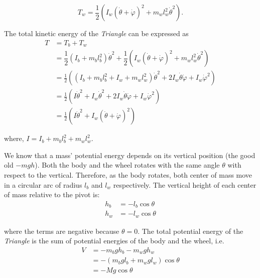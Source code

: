 \documentclass{article}
\begin{document}
\begin{equation}
  T_w=\dfrac{1}{2}\left(I_{w}(\dot{\theta}+\dot{\varphi})^{2}+m_{w}l_{w}^{2}\dot{\theta}^2\right).
\end{equation}

The total kinetic energy of the \textit{Triangle} can be expressed as
\begin{equation}
  \begin{split}
    T&=T_{b}+T_{w}\\
    &=\dfrac{1}{2}\left(I_{b} + m_{b} l_{b}^{2}\right)\dot{\theta}^{2}+\dfrac{1}{2}\left(I_{w}(\dot{\theta}+\dot{\varphi})^{2}+m_{w}l_{w}^{2}\dot{\theta}^2\right)\\
    &= \frac{1}{2}\left(\left(I_b+m_{b}l_{b}^{2}+I_{w}+m_{w}l_{w}^{2}\right)\dot{\theta}^2+2I_{w}\dot{\theta}\dot{\varphi}+I_{w}\dot{\varphi}^2\right)\\
    &= \frac{1}{2}\left(I\dot{\theta}^2+I_{w}\dot{\theta}^{2}+2I_{w}\dot{\theta}\dot{\varphi}+I_{w}\dot{\varphi}^2\right)\\
    &= \frac{1}{2}\left(I\dot{\theta}^{2}+I_{w}(\dot{\theta}+\dot{\varphi})^{2}\right)
  \end{split}
\end{equation}

where, $I=I_b+m_{b}l_{b}^{2}+m_{w}l_{w}^{2}$.

We know that a mass' potential energy depends on its vertical position (the good old $-mgh$). Both the body and the wheel rotates with the same angle $\theta$ with respect to the vertical. Therefore, as the body rotates, both center of mass move in a circular arc of radius $l_{b}$ and $l_{w}$ respectively. The vertical height of each center of mass relative to the pivot is:
\begin{equation*}
  \begin{split}
    h_{b}&=-l_{b}\cos\theta\\
    h_{w}&=-l_{w}\cos\theta
  \end{split}
\end{equation*}

where the terms are negative because $\theta=0$. The total potential energy of the \textit{Triangle} is the sum of potential energies of the body and the wheel, i.e.
\begin{equation}
  \begin{split}
    V&=-m_{b}gh_{b}-m_{w}gh_{w}\\
    &=-(m_{b}gl_{b}+m_{w}gl_{w})\cos\theta\\
    &=-Mg\cos\theta
  \end{split}
\end{equation}
\end{document}
